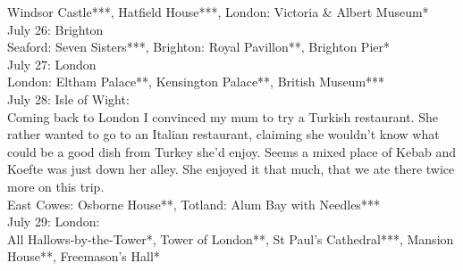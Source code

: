 Windsor Castle***, Hatfield House***, London: Victoria \& Albert Museum*\\
 
July 26: Brighton\\
Seaford: Seven Sisters***, Brighton: Royal Pavillon**, Brighton Pier*\\

July 27: London\\
London: Eltham Palace**, Kensington Palace**, British Museum***\\

July 28: Isle of Wight:\\

Coming back to London I convinced my mum to try a Turkish restaurant. She rather wanted to go to an Italian restaurant, claiming she wouldn't know what could be a good dish from Turkey she'd enjoy. Seems a mixed place of Kebab and Koefte was just down her alley. She enjoyed it that much, that we ate there twice more on this trip.\\

East Cowes: Osborne House**, Totland: Alum Bay with Needles***\\

July 29: London:\\
All Hallows-by-the-Tower*, Tower of London**, St Paul's Cathedral***, Mansion House**, Freemason's Hall*\\

